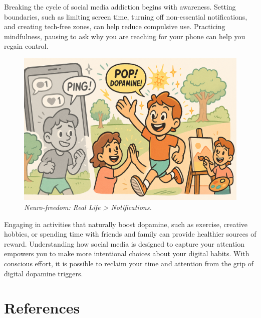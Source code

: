 \documentclass[a4paper,10pt,twocolumn]{memoir}
\begin{document}
{Breaking the cycle of social media addiction begins with awareness. Setting boundaries, such as limiting screen time, turning off non-essential notifications, and creating tech-free zones, can help reduce compulsive use. Practicing mindfulness, pausing to ask why you are reaching for your phone can help you regain control.
\begin{figure}[h!]
  \centering
  \includegraphics[width=0.9\linewidth]{pop.png}
  \caption*{\textit{Neuro-freedom: Real Life > Notifications.}}
\end{figure}
Engaging in activities that naturally boost dopamine, such as exercise, creative hobbies, or spending time with friends and family can provide healthier sources of reward. Understanding how social media is designed to capture your attention empowers you to make more intentional choices about your digital habits. With conscious effort, it is possible to reclaim your time and attention from the grip of digital dopamine triggers.

\section*{References}

}
\end{document}
